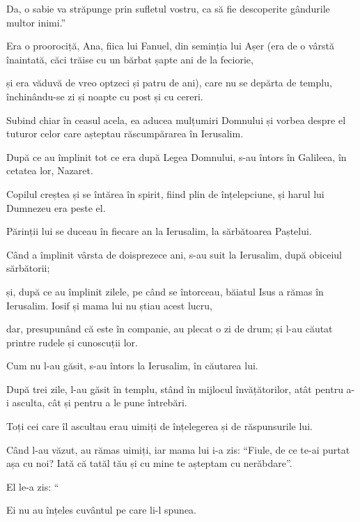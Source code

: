 {Da, o sabie va străpunge prin sufletul vostru, ca să fie descoperite gândurile multor inimi.”


\par }{\PP {}Era o proorociță, Ana, fiica lui Fanuel, din seminția lui Așer (era de o vârstă înaintată, căci trăise cu un bărbat șapte ani de la feciorie,

și era văduvă de vreo optzeci și patru de ani), care nu se depărta de templu, închinându-se zi și noapte cu post și cu cereri.

Subind chiar în ceasul acela, ea aducea mulțumiri Domnului și vorbea despre el tuturor celor care așteptau răscumpărarea în Ierusalim.


\par }{\PP {}După ce au împlinit tot ce era după Legea Domnului, s-au întors în Galileea, în cetatea lor, Nazaret.

Copilul creștea și se întărea în spirit, fiind plin de înțelepciune, și harul lui Dumnezeu era peste el.


\par }{\PP {}Părinții lui se duceau în fiecare an la Ierusalim, la sărbătoarea Paștelui.

Când a împlinit vârsta de doisprezece ani, s-au suit la Ierusalim, după obiceiul sărbătorii;

și, după ce au împlinit zilele, pe când se întorceau, băiatul Isus a rămas în Ierusalim. Iosif și mama lui nu știau acest lucru,

dar, presupunând că este în companie, au plecat o zi de drum; și l-au căutat printre rudele și cunoscuții lor.

Cum nu l-au găsit, s-au întors la Ierusalim, în căutarea lui.

După trei zile, l-au găsit în templu, stând în mijlocul învățătorilor, atât pentru a-i asculta, cât și pentru a le pune întrebări.

Toți cei care îl ascultau erau uimiți de înțelegerea și de răspunsurile lui.

Când l-au văzut, au rămas uimiți, iar mama lui i-a zis: “Fiule, de ce te-ai purtat așa cu noi? Iată că tatăl tău și cu mine te așteptam cu nerăbdare”.


\par }{\PP {}El le-a zis: “{}

Ei nu au înțeles cuvântul pe care li-l spunea.

}
